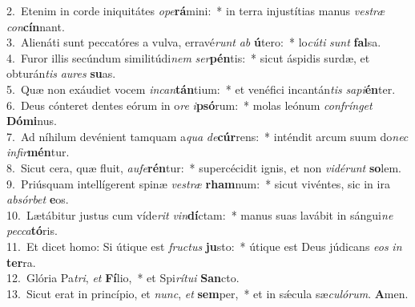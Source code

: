 {2.~}Etenim in corde iniquitátes \textit{o}\textit{pe}\textbf{rá}mini:~* in terra injustítias manus \textit{ve}\textit{stræ} \textit{con}\textbf{cín}nant.\\
{3.~}Alienáti sunt peccatóres a vulva, erravé\textit{runt} \textit{ab} \textbf{ú}tero:~* lo\textit{cú}\textit{ti} \textit{sunt} \textbf{fal}sa.\\
{4.~}Furor illis secúndum similitúdi\textit{nem} \textit{ser}\textbf{pén}tis:~* sicut áspidis surdæ, et obturán\textit{tis} \textit{au}\textit{res} \textbf{su}as.\\
{5.~}Quæ non exáudiet vocem \textit{in}\textit{can}\textbf{tán}tium:~* et venéfici incantán\textit{tis} \textit{sa}\textit{pi}\textbf{én}ter.\\
{6.~}Deus cónteret dentes eórum in o\textit{re} \textit{i}\textbf{psó}rum:~* molas leónum \textit{con}\textit{frín}\textit{get} \textbf{Dó}\textbf{mi}nus.\\
{7.~}Ad níhilum devénient tamquam a\textit{qua} \textit{de}\textbf{cúr}rens:~* inténdit arcum suum do\textit{nec} \textit{in}\textit{fir}\textbf{mén}tur.\\
{8.~}Sicut cera, quæ fluit, \textit{au}\textit{fe}\textbf{rén}tur:~* supercécidit ignis, et non \textit{vi}\textit{dé}\textit{runt} \textbf{so}lem.\\
{9.~}Priúsquam intellígerent spinæ \textit{ve}\textit{stræ} \textbf{rham}num:~* sicut vivéntes, sic in ira \textit{ab}\textit{sór}\textit{bet} \textbf{e}os.\\
{10.~}Lætábitur justus cum víde\textit{rit} \textit{vin}\textbf{dí}ctam:~* manus suas lavábit in sángui\textit{ne} \textit{pec}\textit{ca}\textbf{tó}ris.\\
{11.~}Et dicet homo: Si útique est \textit{fru}\textit{ctus} \textbf{ju}sto:~* útique est Deus júdicans \textit{e}\textit{os} \textit{in} \textbf{ter}ra.\\
{12.~}Glória Pa\textit{tri}, \textit{et} \textbf{Fí}lio,~* et Spi\textit{rí}\textit{tu}\textit{i} \textbf{San}cto.\\
{13.~}Sicut erat in princípio, et \textit{nunc}, \textit{et} \textbf{sem}per,~* et in sǽcula sæ\textit{cu}\textit{ló}\textit{rum}. \textbf{A}men.\\
